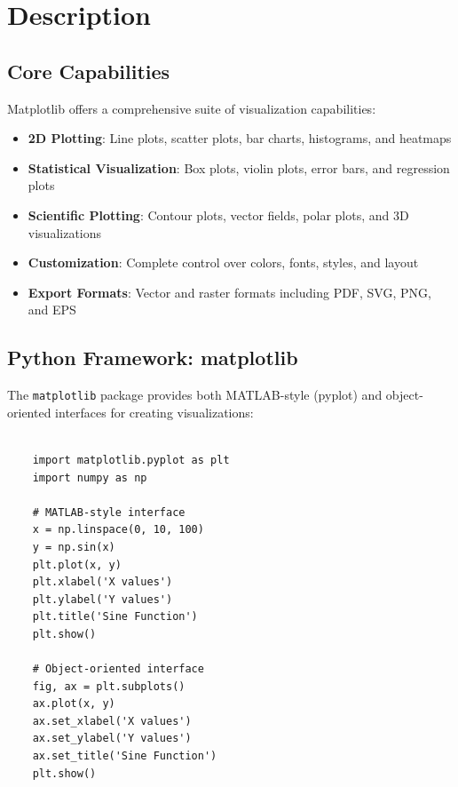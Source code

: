 \section{Description}
\label{sec:matplotlib_description}

\subsection{Core Capabilities}
\label{subsec:matplotlib_capabilities}

Matplotlib offers a comprehensive suite of visualization capabilities:

\begin{itemize}
	\item \textbf{2D Plotting}: Line plots, scatter plots, bar charts, histograms, and heatmaps
	\item \textbf{Statistical Visualization}: Box plots, violin plots, error bars, and regression plots
	\item \textbf{Scientific Plotting}: Contour plots, vector fields, polar plots, and 3D visualizations
	\item \textbf{Customization}: Complete control over colors, fonts, styles, and layout
	\item \textbf{Export Formats}: Vector and raster formats including PDF, SVG, PNG, and EPS
\end{itemize}

\clearpage

\subsection{Python Framework: matplotlib}
\label{subsec:matplotlib}

The \texttt{matplotlib} package provides both MATLAB-style (pyplot) and object-oriented interfaces for creating visualizations:

\begin{lstlisting}[language=MyPython, caption={Matplotlib Core Functions}, label={lst:matplotlib_core}]
	
	import matplotlib.pyplot as plt
	import numpy as np
	
	# MATLAB-style interface
	x = np.linspace(0, 10, 100)
	y = np.sin(x)
	plt.plot(x, y)
	plt.xlabel('X values')
	plt.ylabel('Y values')
	plt.title('Sine Function')
	plt.show()
	
	# Object-oriented interface
	fig, ax = plt.subplots()
	ax.plot(x, y)
	ax.set_xlabel('X values')
	ax.set_ylabel('Y values')
	ax.set_title('Sine Function')
	plt.show()
	
\end{lstlisting}

